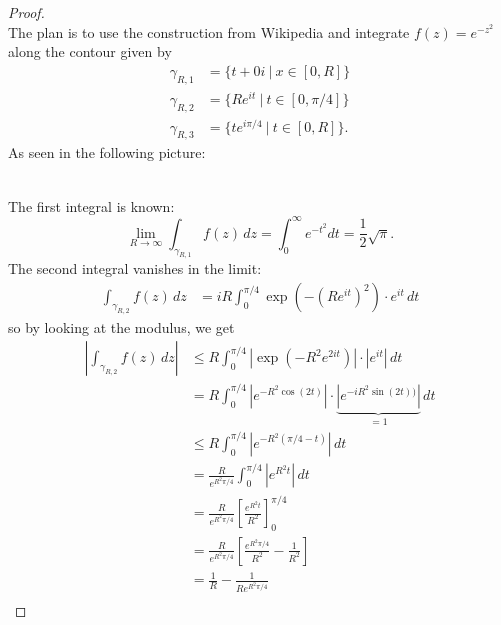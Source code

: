 \documentclass{article}
\begin{document}
\begin{proof} \text{} \\
  The plan is to use the construction from Wikipedia and integrate
  $f(z) = e^{-z^2}$ along the contour given by \begin{align}
    \gamma_{R,1} &= \{t + 0i\ |\ x \in [0, R] \} \\
    \gamma_{R,2} &= \{R e^{it}\ |\ t \in [0,\pi/4] \} \\
    \gamma_{R,3} &= \{te^{i\pi/4}\ |\ t \in [0, R]\}.
  \end{align}
  As seen in the following picture:\\
  \\
  The first integral is known: \[
    \lim_{R\rightarrow \infty}\int_{\gamma_{R,1}} f(z)\,dz
      = \int_0^\infty e^{-t^2} dt
      = \frac{1}{2}\sqrt{\pi}.
  \]
  The second integral vanishes in the limit: \begin{align}
    \int_{\gamma_{R,2}} f(z)\,dz
      &= iR\int_0^{\pi/4}\exp(-(Re^{it})^2)\cdot e^{it}\,dt
  \end{align}
  so by looking at the modulus, we get \begin{align}
    \left|\int_{\gamma_{R,2}} f(z)\,dz\right|
    &\leq R\int_0^{\pi/4}|\exp(-R^2e^{2it})| \cdot |e^{it}|\,dt \\
    &= R\int_0^{\pi/4}|e^{-R^2\cos(2t)}|\cdot\underbrace{|e^{-iR^2\sin(2t))}|}_{=1}\,dt \\
    &\leq R\int_0^{\pi/4}|e^{-R^2(\pi/4 - t)}|\,dt \\
    &= \frac{R}{e^{R^2\pi/4}}\int_0^{\pi/4}|e^{R^2t}|\,dt \\
    &= \frac{R}{e^{R^2\pi/4}}\left[\frac{e^{R^2t}}{R^2}\right]_0^{\pi/4} \\
    &= \frac{R}{e^{R^2\pi/4}}\left[\frac{e^{R^2\pi/4}}{R^2} - \frac{1}{R^2}\right] \\
    &= \frac{1}{R} - \frac{1}{Re^{R^2\pi/4}} \\

\end{align}
\end{proof}
\end{document}
